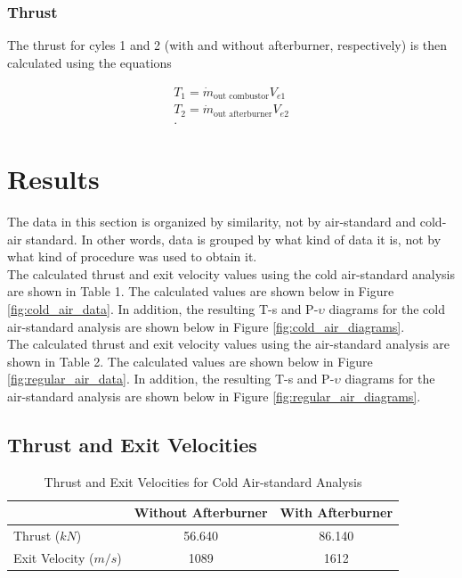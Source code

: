 \documentclass[11pt]{article} %
\begin{document}
\subsubsection*{Thrust}
The thrust for cyles 1 and 2 (with and without afterburner, respectively) is then calculated using the equations

\begin{align*}
T_{1} = \dot{m}_{\text{out combustor}}V_{e1}\\
T_{2} = \dot{m}_{\text{out afterburner}}V_{e2}\\.
\end{align*}


\pagebreak
\section{Results}

The data in this section is organized by similarity, not by air-standard and cold-air standard. In other words, data is grouped by what kind of data it is, not by what kind of procedure was used to obtain it.  \\

The calculated thrust and exit velocity values using the cold air-standard analysis are shown in Table 1. The calculated values are shown below in Figure \ref{fig:cold_air_data}. In addition, the resulting T-s and P-$\upsilon$ diagrams for the cold air-standard analysis are shown below in Figure \ref{fig:cold_air_diagrams}. \\

The calculated thrust and exit velocity values using the air-standard analysis are shown in Table 2. The calculated values are shown below in Figure \ref{fig:regular_air_data}. In addition, the resulting T-s and P-$\upsilon$ diagrams for the air-standard analysis are shown below in Figure \ref{fig:regular_air_diagrams}.

\subsection*{Thrust and Exit Velocities}

\begin{table}[h]
\centering
\caption{Thrust and Exit Velocities for Cold Air-standard Analysis}\par\medskip
\label{tab:cold_air_standard_thrust_velocities}
\begin{tabular}{lcc}
\hline
                           & \multicolumn{1}{r}{Without Afterburner} & \multicolumn{1}{r}{With Afterburner} \\ \hline
Thrust ($\si{kN}$)         & 56.640                                  & 86.140                               \\
Exit Velocity ($\si{m/s}$) & 1089                                    & 1612                                 \\ \hline
\end{tabular}
\end{table}
\end{document}
